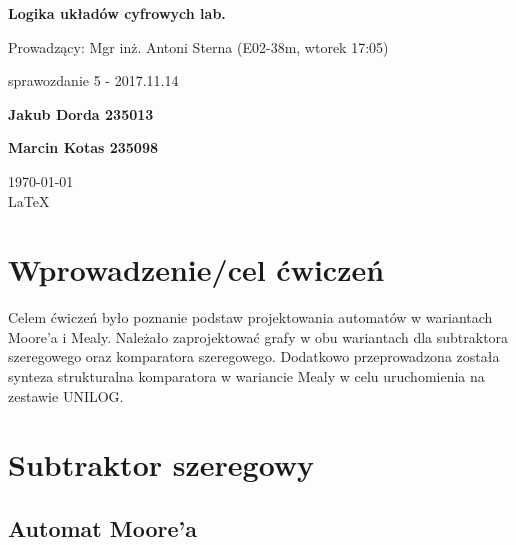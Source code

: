 \documentclass[12pt,a4paper]{article}
\begin{document}
	
	\begin{titlepage}
		
		\centering
		{\huge\bfseries Logika układów cyfrowych lab.\par}
		
		\vspace{0.5cm}
		Prowadzący: Mgr inż. Antoni Sterna (E02-38m, wtorek 17:05) \\
	
		\vspace{1.1cm}
		{\Large sprawozdanie 5 - 2017.11.14\par}
		\vfill
		
		{\large\bfseries Jakub Dorda 235013\par}
		{\large\bfseries Marcin Kotas 235098\par}
		
		\vspace{1cm}
		\today \\ \LaTeX
		
		\restoregeometry
	\end{titlepage}


	\section{Wprowadzenie/cel ćwiczeń}
	
		Celem ćwiczeń było poznanie podstaw projektowania automatów w wariantach Moore'a i Mealy. Należało zaprojektować grafy w obu wariantach dla subtraktora szeregowego oraz komparatora szeregowego. Dodatkowo przeprowadzona została synteza strukturalna komparatora w wariancie Mealy w celu uruchomienia na zestawie UNILOG.
		
		
	\section{Subtraktor szeregowy}
	
		\subsection{Automat Moore'a}
		
\end{document}
